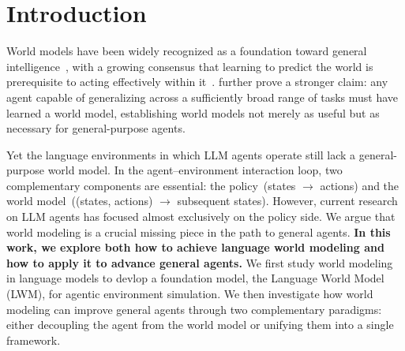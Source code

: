 \section{Introduction}
\label{sec:intro}

World models have been widely recognized as a foundation toward general intelligence~\citep{genie3, worldlabs2025marble, xiang2025pan, ali2025world}, with a growing consensus that learning to predict the world is prerequisite to acting effectively within it~\citep{lecun2022path, hafner2023mastering, hafner2025training, assran2025v}.
\citet{richens2025general} further prove a stronger claim: any agent capable of generalizing across a sufficiently broad range of tasks must have learned a world model, establishing world models not merely as useful but as necessary for general-purpose agents.

 Yet the language environments in which LLM agents operate still lack a general-purpose world model.
In the agent–environment interaction loop, two complementary components are essential: the policy~(states $\rightarrow$ actions) and the world model~((states, actions) $\rightarrow$ subsequent states).
However, current research on LLM agents has focused almost exclusively on the policy side.
We argue that world modeling is a crucial missing piece in the path to general agents.
\textbf{In this work, we explore both how to achieve language world modeling and how to apply it to advance general agents.}
We first study world modeling in language models to devlop a foundation model, the Language World Model (LWM), for agentic environment simulation.
We then investigate how world modeling can improve general agents through two complementary paradigms: either decoupling the agent from the world model or unifying them into a single framework.

